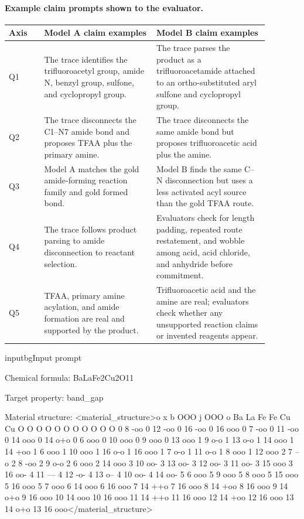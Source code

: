 \begin{appendices}
\paragraph{Example claim prompts shown to the evaluator.}
\begin{longtable}{P{0.12\linewidth}P{0.38\linewidth}P{0.38\linewidth}}
\toprule
\textbf{Axis} & \textbf{Model A claim examples} & \textbf{Model B claim examples} \\
\midrule
Q1 & The trace identifies the trifluoroacetyl group, amide N, benzyl group, sulfone, and cyclopropyl group. &
The trace parses the product as a trifluoroacetamide attached to an ortho-substituted aryl sulfone and cyclopropyl group. \\
Q2 & The trace disconnects the C1--N7 amide bond and proposes TFAA plus the primary amine. &
The trace disconnects the same amide bond but proposes trifluoroacetic acid plus the amine. \\
Q3 & Model A matches the gold amide-forming reaction family and gold formed bond. &
Model B finds the same C--N disconnection but uses a less activated acyl source than the gold TFAA route. \\
Q4 & The trace follows product parsing to amide disconnection to reactant selection. &
Evaluators check for length padding, repeated route restatement, and wobble among acid, acid chloride, and anhydride before commitment. \\
Q5 & TFAA, primary amine acylation, and amide formation are real and supported by the product. &
Trifluoroacetic acid and the amine are real; evaluators check whether any unsupported reaction claims or invented reagents appear. \\
\bottomrule
\end{longtable}

 
 

\begin{fullcotsection}{inputbg}{Input prompt}
\begin{cotverbatim}
Chemical formula: BaLaFe2Cu2O11

Target property: band_gap

Material structure:
<material_structure>o x b OOO j OOO o Ba La Fe Fe Cu Cu O O O O O O O O O O O 0 8 -oo 0 12 -oo 0 16 -oo 0 16 ooo 0 7 -oo 0 11 -oo 0 14 ooo 0 14 o+o 0 6 ooo 0 10 ooo 0 9 ooo 0 13 ooo 1 9 o-o 1 13 o-o 1 14 ooo 1 14 +oo 1 6 ooo 1 10 ooo 1 16 o-o 1 16 ooo 1 7 o-o 1 11 o-o 1 8 ooo 1 12 ooo 2 7 --o 2 8 -oo 2 9 o-o 2 6 ooo 2 14 ooo 3 10 oo- 3 13 oo- 3 12 oo- 3 11 oo- 3 15 ooo 3 16 oo- 4 11 --- 4 12 -o- 4 13 o-- 4 10 oo- 4 14 oo- 5 6 ooo 5 9 ooo 5 8 ooo 5 15 ooo 5 16 ooo 5 7 ooo 6 14 ooo 6 16 ooo 7 14 ++o 7 16 ooo 8 14 +oo 8 16 ooo 9 14 o+o 9 16 ooo 10 14 ooo 10 16 ooo 11 14 ++o 11 16 ooo 12 14 +oo 12 16 ooo 13 14 o+o 13 16 ooo</material_structure> \\


\end{cotverbatim}
\end{fullcotsection}
\end{appendices}
